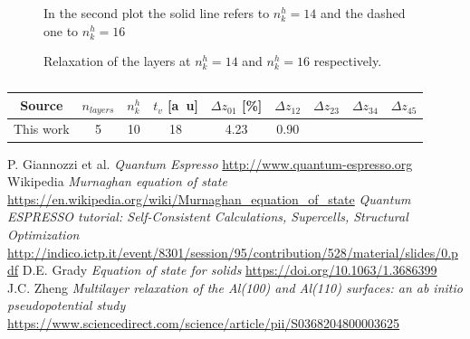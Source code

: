 \documentclass[a4paper, 11pt]{article}
\begin{document}
    \begin{figure}
      \centering
      \caption{In the second plot the solid line refers to $n_k^h = 14$ and the dashed one to $n_k^h = 16$}
      \label{fig:nl11}
    \end{figure}

    \begin{figure}
      \centering
      \caption{Relaxation of the layers at $n_k^h = 14$ and $n_k^h = 16$ respectively.}
      \label{fig:nl11r}
    \end{figure}



    \begin{table}[H]
      \centering
      \begin{tabular}{ccccccccc}
        \toprule
        Source & $n_{layers}$ & $n_k^h$ & $t_v$ [\si{a.u}] & $\Delta z_{01}$ [\%] & $\Delta z_{12}$ & $\Delta z_{23}$ & $\Delta z_{34}$ & $\Delta z_{45}$ \\
        \midrule
        This work & 5  & 10 & 18 & 4.23 & 0.90 & & & \\
        \bottomrule
      \end{tabular}
      \caption{}
      \label{tab:surface_results}
    \end{table}















\begin{thebibliography}{100}
   P. Giannozzi et al. \emph{Quantum Espresso}  \url{http://www.quantum-espresso.org}
   Wikipedia \emph{Murnaghan equation of state}  \url{https://en.wikipedia.org/wiki/Murnaghan_equation_of_state}
    \emph{Quantum ESPRESSO tutorial:  Self-Consistent Calculations, Supercells, Structural Optimization}  \url{http://indico.ictp.it/event/8301/session/95/contribution/528/material/slides/0.pdf}
   D.E. Grady \emph{Equation of state for solids}  \url{https://doi.org/10.1063/1.3686399}
   J.C. Zheng \emph{Multilayer  relaxation  of  the  Al(100)  and  Al(110)  surfaces: an  ab  initio  pseudopotential  study}  \url{https://www.sciencedirect.com/science/article/pii/S0368204800003625}
\end{thebibliography}
\end{document}
